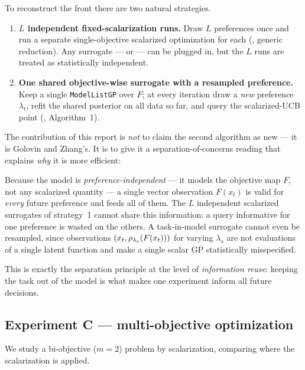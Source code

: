 To reconstruct the front there are two natural strategies.
\begin{enumerate}
  \item \textbf{$L$ independent fixed-scalarization runs.} Draw $L$ preferences
        once and run a separate single-objective scalarized optimization for each
        (\cite{golovin2020}, generic reduction). Any surrogate --- \RIGHT{} or
        \WRONG{} --- can be plugged in, but the $L$ runs are treated as
        statistically independent.
  \item \textbf{One shared objective-wise surrogate with a resampled preference.}
        Keep a single \texttt{ModelListGP} over $F$; at every iteration draw a
        \emph{new} preference $\lambda_t$, refit the shared posterior on all data
        so far, and query the scalarized-UCB point (\cite{golovin2020},
        Algorithm~1).
\end{enumerate}

The contribution of this report is \emph{not} to claim the second algorithm as
new --- it is Golovin and Zhang's. It is to give it a separation-of-concerns
reading that explains \emph{why} it is more efficient:

\begin{takeaway}
Because the \RIGHT{} model is \emph{preference-independent} --- it models the
objective map $F$, not any scalarized quantity --- a single vector observation
$F(x_t)$ is valid for \emph{every} future preference and feeds all of them. The
$L$ independent scalarized surrogates of strategy~1 cannot share this
information: a query informative for one preference is wasted on the others. A
task-in-model surrogate cannot even be resampled, since observations
$(x_t,\rho_{\lambda_s}(F(x_t)))$ for varying $\lambda_s$ are not evaluations of a
single latent function and make a single scalar GP statistically misspecified.
\end{takeaway}

This is exactly the separation principle at the level of \emph{information reuse}:
keeping the task out of the model is what makes one experiment inform all future
decisions. \hfill\Psynth

\subsection{Experiment C --- multi-objective optimization}
\label{sec:contrib-mo-exp}

We study a bi-objective ($m=2$) problem by scalarization, comparing where the
scalarization is applied. \hfill\Pexp

